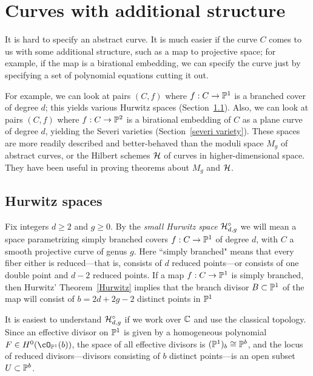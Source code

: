 \section{Curves with additional structure}

It is hard to specify an abstract curve. It is much easier if the curve $C$ comes to us with some additional structure, such as a map to projective space; for example, if the map is a birational embedding, we can specify the curve just by specifying a set of polynomial equations cutting it out. 

For example, we can look at pairs $(C,f)$ where $f : C \to \PP^1$ is a branched cover of degree $d$; this yields various Hurwitz spaces (Section~\ref{hurwitz spaces}).
Also, we can look at pairs $(C,f)$ where $f : C \to \PP^2$ is a birational embedding of $C$ as a plane curve of degree $d$, yielding the Severi varieties (Section~\ref{severi variety}). These spaces are more readily described and better-behaved than the moduli space $M_g$ of abstract curves, or the Hilbert schemes $\cH$ of curves in higher-dimensional space. They have been useful in proving theorems about $M_g$ and $\cH$.

\subsection{Hurwitz spaces}\label{hurwitz spaces}

Fix integers $d \geq 2$ and $g \geq 0$. By the \emph{small Hurwitz space} $\cH^\circ_{d,g}$ we will mean a space parametrizing simply branched covers $f : C \to \PP^1$ of degree $d$, with $C$ a smooth projective curve of genus $g$. Here ``simply branched" means that every fiber  either is reduced---that is, consists of $d$ reduced points---or consists of one double point and $d-2$ reduced points. If a map $f : C \to \PP^1$ is simply branched, then Hurwitz' Theorem~\ref{Hurwitz} implies that the branch divisor $B \subset \PP^1$ of the map will consist of $b = 2d+2g-2$ distinct points in $\PP^1$

It is easiest to understand $\cH^\circ_{d,g}$ if we work over $\CC$ and use the classical topology. Since an effective divisor on $\PP^1$ is given by a homogeneous polynomial $F \in H^0(\cO_{\PP^1}(b))$, the space of all effective divisors is $(\PP^1)_b \cong \PP^b$, and the locus of reduced divisors---divisors consisting of $b$ distinct points---is an open subset $U \subset \PP^b$.


